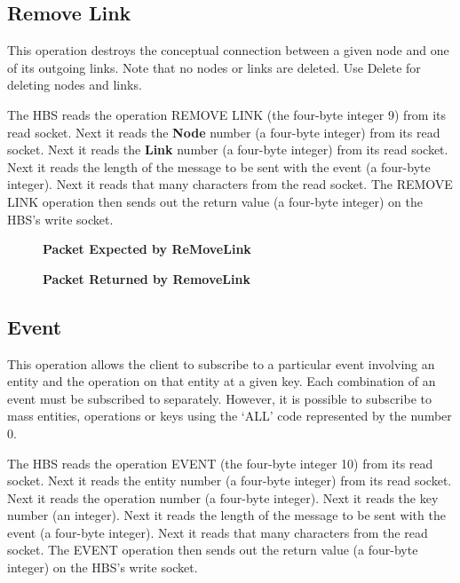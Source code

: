 \newpage
\subsection{Remove Link}

This operation destroys the conceptual connection between a given node and
one of its outgoing links.  Note that no nodes or links are deleted.  Use
Delete for deleting nodes and links.  

The HBS reads the operation REMOVE LINK (the four-byte integer 9) from its
read socket.  Next it reads the {\bf Node} number (a four-byte integer)
from its read socket.  Next it reads the {\bf Link} number (a four-byte
integer) from its read socket.  Next it reads the length of the
message to be sent with the event (a four-byte integer).  Next it reads
that many characters from the read socket.  The REMOVE LINK operation
then sends out the return value (a four-byte integer) on the HBS's write
socket.

\begin{figure}[htb]
  \centerline{}
  \caption{{\bf Packet Expected by ReMoveLink}}
  \label{fig:ReMoveLink1}
\end{figure}


\begin{figure}[htb]
  \centerline{}
  \caption{{\bf Packet Returned by RemoveLink}}
  \label{fig:ReMoveLink2}
\end{figure}

\newpage
\subsection{Event}

This operation allows the client to subscribe to a particular event
involving an entity and the operation on that entity at a given key.  Each
combination of an event must be subscribed to separately.  However, it is
possible to subscribe to mass entities, operations or keys using the `ALL'
code represented by the number 0.  

The HBS reads the operation EVENT (the four-byte integer 10) from its read
socket.  Next it reads the entity number (a four-byte integer) from its
read socket.  Next it reads the operation number (a four-byte integer).
Next it reads the key number (an integer).  Next it reads the length
of the message to be sent with the event (a four-byte integer).  Next it
reads that many characters from the read socket.  The EVENT operation
then sends out the return value (a four-byte integer) on the HBS's write
socket.

